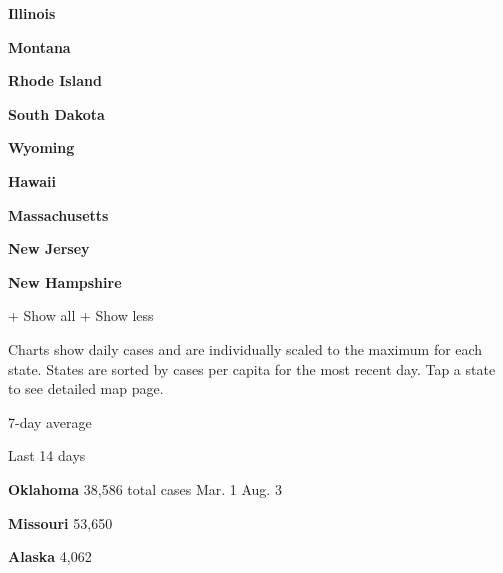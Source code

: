 \textbf{Illinois}

\href{https://www.nytimes.com/interactive/2020/us/montana-coronavirus-cases.html}{}

\textbf{Montana}

\href{https://www.nytimes.com/interactive/2020/us/rhode-island-coronavirus-cases.html}{}

\textbf{Rhode Island}

\href{https://www.nytimes.com/interactive/2020/us/south-dakota-coronavirus-cases.html}{}

\textbf{South Dakota}

\href{https://www.nytimes.com/interactive/2020/us/wyoming-coronavirus-cases.html}{}

\textbf{Wyoming}

\href{https://www.nytimes.com/interactive/2020/us/hawaii-coronavirus-cases.html}{}

\textbf{Hawaii}

\href{https://www.nytimes.com/interactive/2020/us/massachusetts-coronavirus-cases.html}{}

\textbf{Massachusetts}

\href{https://www.nytimes.com/interactive/2020/us/new-jersey-coronavirus-cases.html}{}

\textbf{New Jersey}

\href{https://www.nytimes.com/interactive/2020/us/new-hampshire-coronavirus-cases.html}{}

\textbf{New Hampshire}

+ Show all + Show less

Charts show daily cases and are individually scaled to the maximum for
each state. States are sorted by cases per capita for the most recent
day. Tap a state to see detailed map page.

\href{https://www.nytimes.com/interactive/2020/us/oklahoma-coronavirus-cases.html}{}

7-day average

Last 14 days

\textbf{Oklahoma} 38,586 total cases Mar. 1 Aug. 3

\href{https://www.nytimes.com/interactive/2020/us/missouri-coronavirus-cases.html}{}

\textbf{Missouri} 53,650

\href{https://www.nytimes.com/interactive/2020/us/alaska-coronavirus-cases.html}{}

\textbf{Alaska} 4,062

\href{https://www.nytimes.com/interactive/2020/us/nebraska-coronavirus-cases.html}{}

